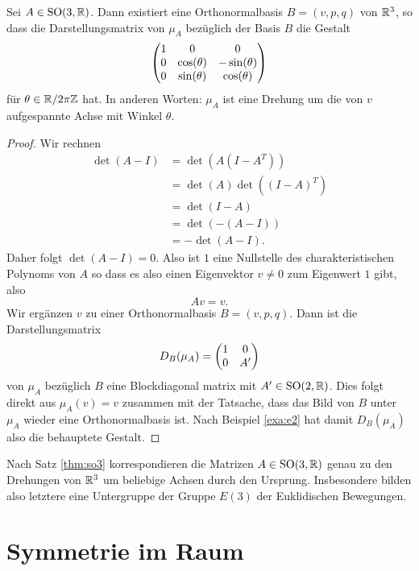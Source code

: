 \documentclass{book}
\begin{document}
\begin{thm}
    \label{thm:so3} Sei $A \in \operatorname{SO}(3,\mathbb{R})$. Dann existiert eine
    Orthonormalbasis $B = (v, p, q)$ von $\mathbb{R}^3$, so dass die Darstellungsmatrix von $\mu_A$ bezüglich der Basis $B$ die Gestalt
    \[
        \begin{pmatrix}  1 & 0 & 0\\ 0 & \cos(\theta) & -\sin(\theta)\\ 0 & \sin(\theta) & \cos(\theta)  \end{pmatrix}
    \]
    für $\theta \in \mathbb{R}/ 2 \pi \mathbb{Z}$ hat. In anderen Worten: $\mu_A$ ist eine
    Drehung um die von $v$ aufgespannte Achse mit Winkel $\theta$. 
\end{thm}
\begin{proof}
    Wir rechnen
    \begin{align}
        \det( A - I) & = \det( A (I - A^T) ) \\
                     & = \det(A) \det((I-A)^T)\\
                     & = \det(I-A)\\
                     & = \det(-(A-I))\\
                     & = - \det(A-I).
    \end{align}
    Daher folgt $\det(A-I) = 0$. Also ist $1$ eine Nullstelle des
    charakteristischen Polynoms von $A$ so dass es also einen Eigenvektor $v
    \ne 0$ zum Eigenwert $1$ gibt, also 
    \[
        A v = v.
    \]
    Wir ergänzen $v$ zu einer Orthonormalbasis $B = (v, p, q)$. Dann ist die Darstellungsmatrix 
    \[
        D_{B}(\mu_A) = \begin{pmatrix}  1 & 0\\
        0 & A'  \end{pmatrix}
    \]
    von $\mu_A$ bezüglich $B$ eine Blockdiagonal matrix mit $A' \in
    \operatorname{SO}(2,\mathbb{R})$. Dies folgt direkt aus $\mu_A(v) = v$ zusammen mit der
    Tatsache, dass das Bild von $B$ unter $\mu_A$ wieder eine Orthonormalbasis
    ist. Nach Beispiel \ref{exa:e2} hat damit $D_B(\mu_A)$ also die behauptete Gestalt.
\end{proof}

\begin{rem}
    \label{rem:drehungen}
    Nach Satz \ref{thm:so3} korrespondieren die Matrizen $A \in
    \operatorname{SO}(3,\mathbb{R})$ genau zu den Drehungen von $\mathbb{R}^3$ um beliebige Achsen durch
    den Ursprung. Insbesondere bilden also letztere eine Untergruppe der Gruppe
    $E(3)$ der Euklidischen Bewegungen. 
\end{rem}

\section{Symmetrie im Raum}%
\label{sec:symmetrie_im_raum}
\end{document}

